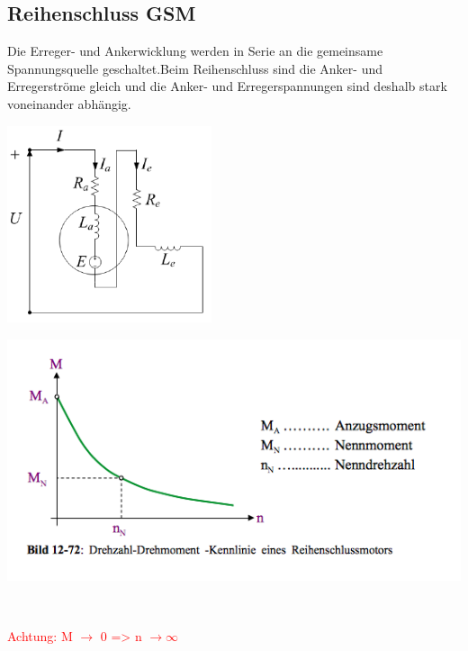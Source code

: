 \subsection{Reihenschluss GSM}
Die Erreger- und Ankerwicklung werden in Serie an die gemeinsame Spannungsquelle geschaltet.\newline Beim Reihenschluss sind die Anker- und Erregerströme gleich und die Anker- und Erregerspannungen sind deshalb \newline stark voneinander abhängig.\newline
\begin{minipage}[b]{0.4\textwidth}
	\raggedright
	\includegraphics[width=6cm]{images/Reihenschluss.png}
\end{minipage}
\begin{minipage}[b]{0.5\textwidth}
	\raggedright
	\includegraphics[scale = 0.6]{images/KennlinieReihenschluss}
\end{minipage}\\
\begin{minipage}[b]{0.7\linewidth}
\raggedleft
\textcolor{red}{Achtung: M $\rightarrow$ 0 => n $\rightarrow \infty$}
\end{minipage}
\\

